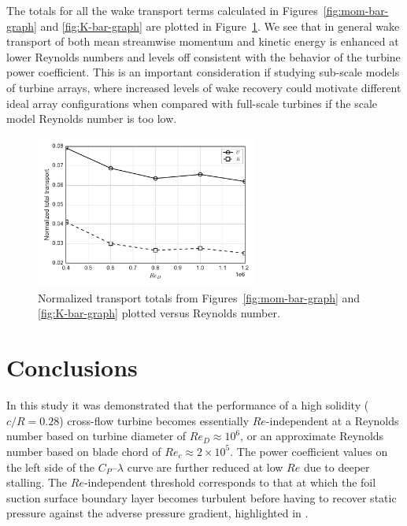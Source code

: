 \documentclass[energies,article,accept,moreauthors,pdftex,12pt,a4paper]{mdpi}
\begin{document}
The totals for all the wake transport terms calculated in
Figures~\ref{fig:mom-bar-graph} and \ref{fig:K-bar-graph} are plotted in
Figure~\ref{fig:wake-trans-totals}. We see that in general wake transport of
both mean streamwise momentum and kinetic energy is enhanced at lower Reynolds
numbers and levels off consistent with the behavior of the turbine power
coefficient. This is an important consideration if studying sub-scale models of
turbine arrays, where increased levels of wake recovery could motivate different
ideal array configurations when compared with full-scale turbines if the scale
model Reynolds number is too low.

\begin{figure}[ht!]
\centering
\includegraphics[width=0.65\textwidth]{figures/wake_trans_totals}
\caption{Normalized transport totals from Figures~\ref{fig:mom-bar-graph} and
\ref{fig:K-bar-graph} plotted versus Reynolds number.}
\label{fig:wake-trans-totals}
\end{figure}


\section{Conclusions}

In this study it was demonstrated that the performance of a high solidity
($c/R=0.28$) cross-flow turbine becomes essentially $Re$-independent at a
Reynolds number based on turbine diameter of $Re_D \approx 10^6$, or an
approximate Reynolds number based on blade chord of $Re_c \approx 2 \times
10^5$. The power coefficient values on the left side of the $C_P$--$\lambda$
curve are further reduced at low $Re$ due to deeper stalling. The
$Re$-independent threshold corresponds to that at which the foil suction surface
boundary layer becomes turbulent before having to recover static pressure
against the adverse pressure gradient, highlighted in \cite{Lissaman1983,
    McMasters1980, Carmichael1981}.
\end{document}
